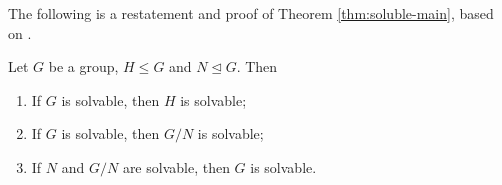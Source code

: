 
The following is a restatement and proof of Theorem \ref{thm:soluble-main}, based on \cite[Chapter~14]{Stewart}.

\begin{theorem} \label{thm:soluble-main-appendix}
	Let $G$ be a group, $H \le G$ and $N \trianglelefteq G$. Then 
	\begin{enumerate}
		\item If $G$ is solvable, then $H$ is solvable;
		\item If $G$ is solvable, then $G / N$ is solvable; 
		\item If $N$ and $G / N$ are solvable, then $G$ is solvable. 
	\end{enumerate}
\end{theorem}
